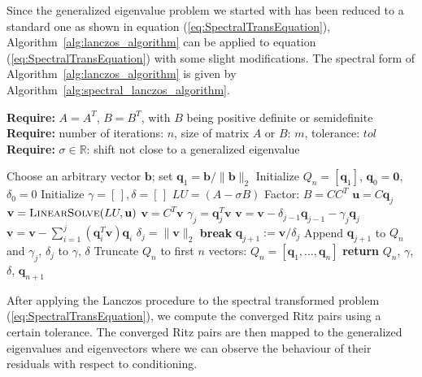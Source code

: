 Since the generalized eigenvalue problem we started with has been reduced to a standard one as shown in equation (\ref{eq:SpectralTransEquation}), Algorithm~\ref{alg:lanczos_algorithm} can be applied to equation (\ref{eq:SpectralTransEquation}) with some slight modifications. The spectral form of Algorithm~\ref{alg:lanczos_algorithm} is given by Algorithm~\ref{alg:spectral_lanczos_algorithm}.
\begin{algorithm}
	\caption{Spectral Lanczos Algorithm for (\ref{eq:SpectralTransEquation}) }
	\label{alg:spectral_lanczos_algorithm}
	
	\textbf{Require:} \( A = A^T \), \( B = B^T \), with \(B\) being positive definite or semidefinite\\
	\textbf{Require:} number of iterations: \(n\), size of matrix $A$ or $B$: $m$, tolerance: \(tol\)\\
	\textbf{Require:} \(\sigma \in \mathbb{R}\): shift not close to a generalized eigenvalue
	\begin{algorithmic}[1]
		\State Choose an arbitrary vector $\mathbf{b}$; set $\mathbf{q}_1 = \mathbf{b}/ \|\mathbf{b}\|_2$
		\State Initialize $Q_n = [\mathbf{q}_1]$, $\mathbf{q}_0 = \mathbf{0}$, $\delta_0 = 0$
		\State Initialize $\gamma = [\,], \delta = [\,]$ 
		\State $LU = (A - \sigma B)$ 
		\State Factor: $B = CC^T$ 
		\State $\mathbf{u} = C\mathbf{q}_j$ 
		\State $\mathbf{v} = \textsc{LinearSolve}(LU, \mathbf{u})$ 
		\State $\mathbf{v} = C^T \mathbf{v}$ 
		\State $\gamma_j = \mathbf{q}_j^T \mathbf{v} $ 
		\State $\mathbf{v} = \mathbf{v} - \delta_{j-1}\mathbf{q}_{j-1} - \gamma_j \mathbf{q}_j$ 
		\State $\mathbf{v} = \mathbf{v} - \sum_{i=1}^j (\mathbf{q}_i^T \mathbf{v})\mathbf{q}_i$ 
		\State $\delta_{j} = \|\mathbf{v}\|_2$ 
		\State \textbf{break}
		\EndIf
		\State $\mathbf{q}_{j+1} := \mathbf{v} / \delta_{j}$
		\State Append $\mathbf{q}_{j+1}$ to $Q_n$ and $\gamma_j$, $\delta_{j}$ to $\gamma$, $\delta$
		\EndFor
		\State Truncate $Q_n$ to first $n$ vectors: $Q_n = [\mathbf{q}_1, \dots, \mathbf{q}_n]$
		\State \textbf{return} $Q_n$, $\gamma$, $\delta$, $\mathbf{q}_{n+1}$
		\EndFunction
	\end{algorithmic}
\end{algorithm}
After applying the Lanczos procedure to the spectral transformed problem (\ref{eq:SpectralTransEquation}), we compute the converged Ritz pairs using a certain tolerance. The converged Ritz pairs are then mapped to the generalized eigenvalues and eigenvectors where we can observe the behaviour of their residuals with respect to conditioning.

